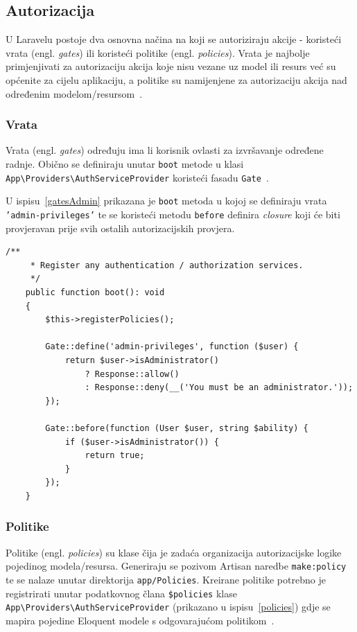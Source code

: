 \subsection{Autorizacija}
U Laravelu postoje dva osnovna načina na koji se autoriziraju akcije - koristeći vrata (engl. \textit{gates}) ili koristeći politike (engl. \textit{policies}). Vrata je najbolje primjenjivati za autorizaciju akcija koje nisu vezane uz model ili resurs već su općenite za cijelu aplikaciju, a politike su namijenjene za autorizaciju akcija nad određenim modelom/resursom~\cite{authorization}.

\subsubsection{Vrata}
Vrata (engl. \textit{gates}) određuju ima li korisnik ovlasti za izvršavanje određene radnje. Obično se definiraju unutar \texttt{boot} metode u klasi \\ {\texttt{App\textbackslash Providers\textbackslash AuthServiceProvider}} koristeći fasadu \texttt{Gate}~\cite{authorization}.

U ispisu~\ref{gatesAdmin} prikazana je \texttt{boot} metoda u kojoj se definiraju vrata \\ \texttt{'admin-privileges'} te se koristeći metodu \texttt{before} definira \textit{closure} koji će biti provjeravan prije svih ostalih autorizacijskih provjera.

\begin{lstlisting}[caption={Vrata korištena za implementaciju admin korisnika i administratorskog sučelja}, label=gatesAdmin]
    /**
     * Register any authentication / authorization services.
     */
    public function boot(): void
    {
        $this->registerPolicies();

        Gate::define('admin-privileges', function ($user) {
            return $user->isAdministrator()
                ? Response::allow()
                : Response::deny(__('You must be an administrator.'));
        });

        Gate::before(function (User $user, string $ability) {
            if ($user->isAdministrator()) {
                return true;
            }
        });
    }
\end{lstlisting}

\subsubsection{Politike}
Politike (engl. \textit{policies}) su klase čija je zadaća organizacija autorizacijske logike pojedinog modela/resursa. Generiraju se pozivom Artisan naredbe \texttt{make:policy} te se nalaze unutar direktorija \texttt{app/Policies}. Kreirane politike potrebno je registrirati unutar podatkovnog člana \texttt{\$policies} klase {\texttt{App\textbackslash Providers\textbackslash AuthServiceProvider}}  (prikazano u ispisu~\ref{policies}) gdje se mapira pojedine Eloquent modele s odgovarajućom politikom~\cite{authorization}.

